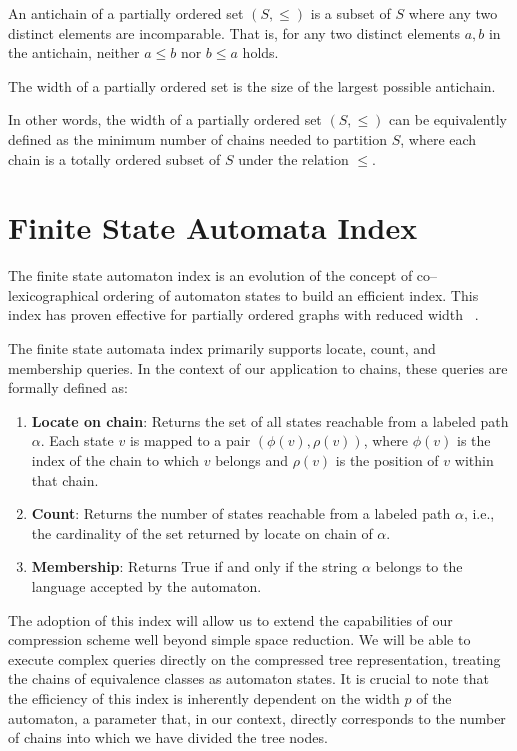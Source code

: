 \begin{definition}[Antichain]
    An antichain of a partially ordered set $(S, \leq)$ is a subset of $S$ where any two distinct elements are incomparable. That is, for any two distinct elements $a, b$ in the antichain, neither $a \leq b$ nor $b \leq a$ holds.
\end{definition}

\begin{definition}[Width]
    The width of a partially ordered set is the size of the largest possible antichain.
\end{definition}
In other words, the width of a partially ordered set $(S, \leq)$ can be equivalently defined as the minimum number of chains needed to partition $S$, where each chain is a totally ordered subset of $S$ under the relation $\leq$.

\section{Finite State Automata Index}
The finite state automaton index is an evolution of the concept of co--lexicographical ordering of automaton states to build an efficient index. This index has proven effective for partially ordered graphs with reduced width ~\cite{cotumaccio2023co}.

The finite state automata index primarily supports locate, count, and membership queries. In the context of our application to chains, these queries are formally defined as:

\begin{enumerate}
    \item \textbf{Locate on chain}: Returns the set of all states reachable from a labeled path $\alpha$. Each state $v$ is mapped to a pair $(\phi(v), \rho(v))$, where $\phi(v)$ is the index of the chain to which $v$ belongs and $\rho(v)$ is the position of $v$ within that chain.
    \item \textbf{Count}: Returns the number of states reachable from a labeled path $\alpha$, i.e., the cardinality of the set returned by locate on chain of $\alpha$.
    \item \textbf{Membership}: Returns True if and only if the string $\alpha$ belongs to the language accepted by the automaton.
\end{enumerate}

The adoption of this index will allow us to extend the capabilities of our compression scheme well beyond simple space reduction. We will be able to execute complex queries directly on the compressed tree representation, treating the chains of equivalence classes as automaton states. It is crucial to note that the efficiency of this index is inherently dependent on the width $p$ of the automaton, a parameter that, in our context, directly corresponds to the number of chains into which we have divided the tree nodes.

